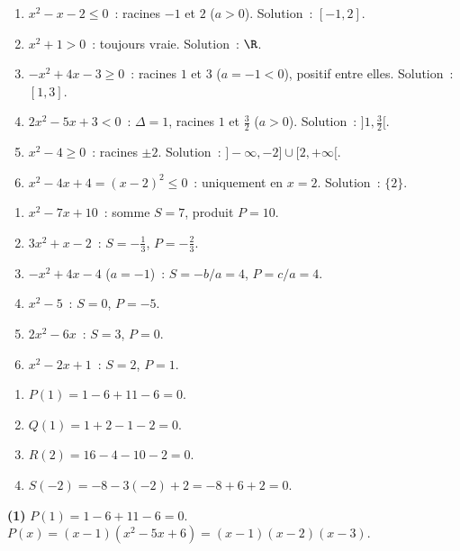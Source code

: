 \begin{enumerate}
  \item $x^2-x-2\leq0$~: racines $-1$ et $2$ ($a>0$). Solution~: $[-1,2]$.
  \item $x^2+1>0$~: toujours vraie. Solution~: $\R$.
  \item $-x^2+4x-3\geq0$~: racines $1$ et $3$ ($a=-1<0$), positif entre elles.
        Solution~: $[1,3]$.
  \item $2x^2-5x+3<0$~: $\Delta=1$, racines $1$ et $\frac{3}{2}$ ($a>0$).
        Solution~: $\bigl]1,\tfrac{3}{2}\bigr[$.
  \item $x^2-4\geq0$~: racines $\pm2$. Solution~: $]-\infty,-2]\cup[2,+\infty[$.
  \item $x^2-4x+4=(x-2)^2\leq0$~: uniquement en $x=2$. Solution~: $\{2\}$.
\end{enumerate}


\begin{enumerate}
  \item $x^2-7x+10$~: somme $S=7$, produit $P=10$.
  \item $3x^2+x-2$~: $S=-\tfrac{1}{3}$, $P=-\tfrac{2}{3}$.
  \item $-x^2+4x-4$ ($a=-1$)~: $S=-b/a=4$, $P=c/a=4$.
  \item $x^2-5$~: $S=0$, $P=-5$.
  \item $2x^2-6x$~: $S=3$, $P=0$.
  \item $x^2-2x+1$~: $S=2$, $P=1$.
\end{enumerate}


\begin{enumerate}
  \item $P(1)=1-6+11-6=0$.\checkmark
  \item $Q(1)=1+2-1-2=0$.\checkmark
  \item $R(2)=16-4-10-2=0$.\checkmark
  \item $S(-2)=-8-3(-2)+2=-8+6+2=0$.\checkmark
\end{enumerate}


\textbf{(1)} $P(1)=1-6+11-6=0$.\checkmark\quad
$P(x)=(x-1)(x^2-5x+6)=(x-1)(x-2)(x-3)$.

